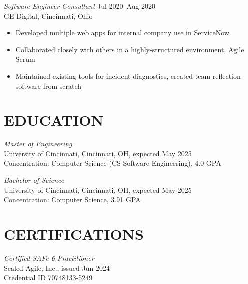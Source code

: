 \documentclass[margin]{res} %
\begin{document}
\begin{resume}
{\sl Software Engineer Consultant} \hfill {\color{black} Jul 2020–Aug 2020} \\
GE Digital, Cincinnati, Ohio
\begin{itemize} \itemsep -2pt %
\item Developed multiple web apps for internal company use in ServiceNow
\item Collaborated closely with others in a highly-structured environment, Agile Scrum
\item Maintained existing tools for incident diagnostics, created team reflection\\software from scratch
\end{itemize} 


\section{EDUCATION}

{\sl Master of Engineering }\\
University of Cincinnati, Cincinnati, OH, expected May 2025 \\
Concentration: Computer Science (CS Software Engineering), 4.0 GPA

{\sl Bachelor of Science}\\
University of Cincinnati, Cincinnati, OH, expected May 2025 \\
Concentration: Computer Science, 3.91 GPA


\section{CERTIFI\-CATIONS}

{\sl Certified SAFe\textsuperscript{\tiny\textregistered} 6 Practitioner}\\
Scaled Agile, Inc., issued Jun 2024\\
Credential ID 70748133-5249



\end{resume}
\end{document}

